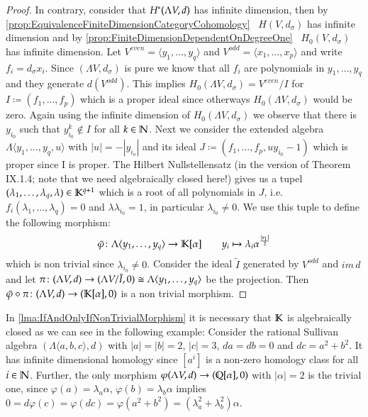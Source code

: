 \begin{proof}
  In contrary, consider that $H^*(\Lambda V,d)$ has infinite dimension, then by \ref{prop:EquivalenceFiniteDimensionCategoryCohomology}
  ~$H(V, d_{\sigma})$ has infinite dimension and by \ref{prop:FiniteDimensionDependentOnDegreeOne} ~$H_0(V, d_{\sigma})$ has
  infinite dimension. Let ${V^{even} = \langle y_1, \ldots , y_q \rangle}$ and 
  ${V^{odd} = \langle x_1 , \ldots , x_p \rangle}$ and write
  $f_i = d_{\sigma} x_i$. Since $(\Lambda V, d_{\sigma})$ is pure we know that all $f_i$ are 
  polynomials in $y_1, \ldots , y_q$ and they generate $d(V^{odd})$. This implies 
  $H_0(\Lambda V,d_{\sigma}) = V^{even} / I$ for $I \coloneqq (f_1, \ldots, f_p)$ which is a proper ideal since otherways
  $H_0(\Lambda V,d_{\sigma})$ would be zero. Again using the infinite dimension of 
  $H_0(\Lambda V,d_{\sigma})$ we observe that there is $y_{i_0}$ such that
  $y_{i_0}^k \notin I$ for all $k \in \mathbb{N}$. Next we consider the extended algebra 
  $\Lambda \langle y_1, \ldots, y_q, u \rangle$ with $|u| = - |y_{i_o}|$ and its ideal 
  $J \coloneqq (f_1, \ldots, f_p, u y_{i_0} - 1)$ which is proper since I is proper.
  The Hilbert Nullstellensatz (in the version of \cite{Lang2002} Theorem IX.1.4; note that we need algebraically closed here!)
   gives us a tupel 
  $(\lambda_1, \ldots, \lambda_q, \lambda) \in \mathbb{K}^{q+1}$ which is a root of all polynomials in $J$,
  i.e.\ $f_i(\lambda_1, \ldots, \lambda_q) = 0$ and $\lambda \lambda_{i_0} = 1$, in particular 
  $\lambda_{i_0} \neq 0$. We use this tuple to define the following morphism:
  $$ \bar{\varphi} \colon  \Lambda \langle y_1, \ldots, y_q \rangle \to \mathbb{K}[\alpha]
  \qquad y_i \mapsto \lambda_i \alpha^{\frac{|y_1]}{2}}$$
  which is non trivial since $\lambda_{i_0} \neq 0$. Consider the ideal $\tilde{I}$ generated by 
  $V^{odd}$ and $im \, d$ and let $\pi \colon (\Lambda V,d) \to (\Lambda V / \tilde{I} , 0) 
  \cong \Lambda \langle y_1, \ldots, y_q \rangle $ be the projection. Then 
  ${ \bar{\varphi} \circ \pi \colon (\Lambda V,d) \to (\mathbb{K}[\alpha], 0)}$ is a non trivial morphism.
 \end{proof}
 
 \begin{Remark}
  In \ref{lma:IfAndOnlyIfNonTrivialMorphism} it is necessary that $\mathbb{K}$ is algebraically closed 
  as we can see in the following example: \newline
  Consider the rational Sullivan algebra $(\Lambda \langle a, b, c \rangle,d)$ with $|a| = |b| = 2$, $|c| = 3$,
  $da = db = 0$ and $dc = a^2 + b^2$. It has infinite dimensional homology since $ [a^i]$ is a non-zero homology
  class for all $i \in \mathbb{N}$. Further, the only morphism $\varphi (\Lambda V,d) \to (\mathbb{Q}[\alpha], 0)$ with $|\alpha| = 2$ is the
  trivial one, since $\varphi (a) = \lambda_a \alpha$, $\varphi (b) = \lambda_b \alpha$ implies 
  $ 0 = d\varphi (c) = \varphi(dc) = \varphi( a^2 + b^2) = (\lambda_a^2 + \lambda_b^2) \alpha$.
  
 \end{Remark}

